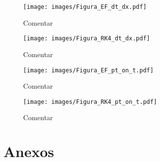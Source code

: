 \documentclass[9pt,technote,twoside,letterpaper,onecolumn]{IEEEtran}
\begin{document}
\begin{multicols}{2}
\begin{figure*}
  \centering
  \texttt{[image: images/Figura\_EF\_dt\_dx.pdf]}
  \caption{Comentar}
  \label{fig:EF_dt_dx}
\end{figure*}

\begin{figure*}
  \centering
  \texttt{[image: images/Figura\_RK4\_dt\_dx.pdf]}
  \caption{Comentar}
  \label{fig:RK4_dt_dx}
\end{figure*}

\begin{figure*}
  \centering
  \texttt{[image: images/Figura\_EF\_pt\_on\_t.pdf]}
  \caption{Comentar}
  \label{fig:EF_pt_on_t}
\end{figure*}

\begin{figure*}
  \centering
  \texttt{[image: images/Figura\_RK4\_pt\_on\_t.pdf]}
  \caption{Comentar}
  \label{fig:RK4_pt_on_t}
\end{figure*}



\end{multicols}

\newpage
\section{Anexos}
\label{sec:anexos}
\end{document}
